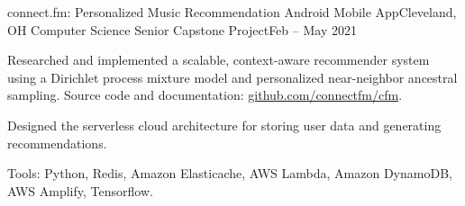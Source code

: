 \begin{ritemize}
{connect.fm: Personalized Music Recommendation Android Mobile App}{Cleveland, OH}
{Computer Science Senior Capstone Project}{Feb -- May 2021}
	\item Researched and implemented a scalable, context-aware recommender system using a Dirichlet process mixture model and personalized near-neighbor ancestral sampling. Source code and documentation: \url{github.com/connectfm/cfm}.
	\item Designed the serverless cloud architecture for storing user data and generating recommendations.
	\item Tools: Python, Redis, Amazon Elasticache, AWS Lambda, Amazon DynamoDB, AWS Amplify, Tensorflow.
\end{ritemize}